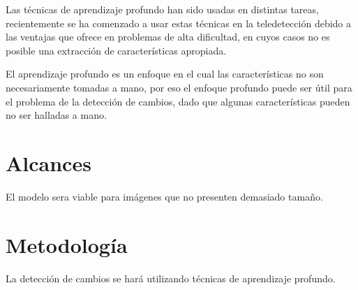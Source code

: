 Las técnicas de aprendizaje profundo han sido usadas en distintas tareas, recientemente se ha comenzado a usar estas técnicas en la teledetección \cite{zhang2016deep} debido a las ventajas que ofrece en problemas de alta dificultad, en cuyos casos no es posible una extracción de características apropiada.

 El aprendizaje profundo es un enfoque en el cual las características no son necesariamente tomadas a mano, por eso el enfoque profundo puede ser útil para el problema de la detección de cambios, dado que algunas características pueden no ser halladas a mano.
 \section{Alcances}
El modelo sera viable para imágenes que no presenten demasiado tamaño.










\section{Metodología}
La detección de cambios se hará utilizando técnicas de aprendizaje profundo.

